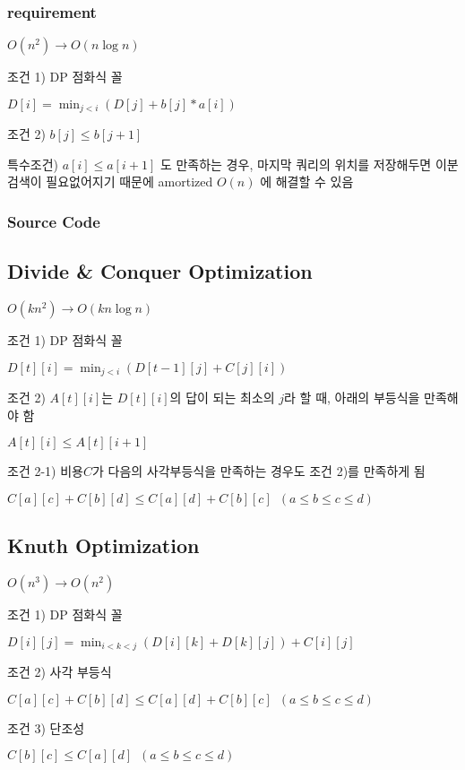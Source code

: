 \documentclass[10pt,landscape,a4paper,twocolumn]{article}
\begin{document}
\subsubsection{requirement}
$O(n^{2}) \to O(n\log{n})$

조건 1) DP 점화식 꼴

$D[i] = \min_{j<i}( D[j] + b[j] * a[i] )$

조건 2) $b[j] \leq b[j+1]$

특수조건) $a[i] \leq a[i+1]$ 도 만족하는 경우, 마지막 쿼리의 위치를 저장해두면 이분검색이 필요없어지기 때문에 amortized $O(n)$ 에 해결할 수 있음
\subsubsection{Source Code}


\subsection{Divide \& Conquer Optimization}

$O(kn^{2}) \to O(kn\log{n})$

조건 1) DP 점화식 꼴

$D[t][i] = \min_{j<i}( D[t-1][j] + C[j][i] )$

조건 2) $A[t][i]$는 $D[t][i]$의 답이 되는 최소의 $j$라 할 때, 아래의 부등식을 만족해야 함

$A[t][i] \leq A[t][i+1]$

조건 2-1) 비용$C$가 다음의 사각부등식을 만족하는 경우도 조건 2)를 만족하게 됨

$C[a][c] + C[b][d] \leq C[a][d] + C[b][c] \phantom{1} (a \leq b \leq c \leq d)$

\subsection{Knuth Optimization}

$O(n^{3}) \to O(n^{2})$

조건 1) DP 점화식 꼴

$D[i][j] = \min_{i<k<j}( D[i][k] + D[k][j] ) + C[i][j]$

조건 2) 사각 부등식

$C[a][c] + C[b][d] \leq C[a][d] + C[b][c] \phantom{1} (a \leq b \leq c \leq d)$

조건 3) 단조성

$C[b][c] \leq C[a][d] \phantom{1} (a \leq b \leq c \leq d)$
\end{document}
